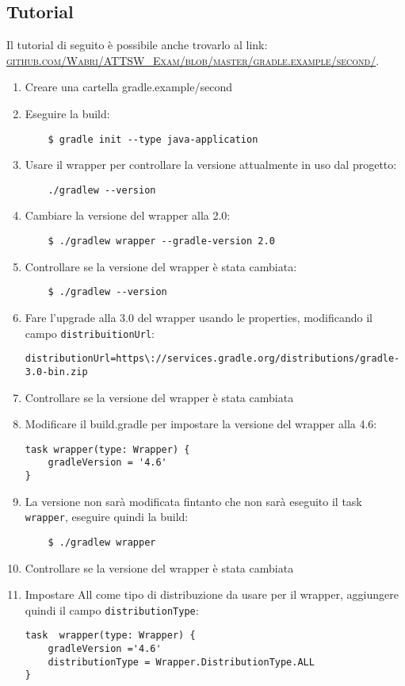 \subsection{Tutorial}
Il tutorial di seguito è possibile anche trovarlo al link: \href{https://github.com/Wabri/ATTSW_Exam/blob/master/gradle.example/second/}{\textsc{github.com/Wabri/ATTSW\_Exam/blob/master/gradle.example/second/}}.
\begin{enumerate}
    \item Creare una cartella gradle.example/second
    \item Eseguire la build:
\begin{verbatim}
    $ gradle init --type java-application
\end{verbatim}
    \item Usare il wrapper per controllare la versione attualmente in uso dal progetto:
\begin{verbatim}
    ./gradlew --version\end{verbatim}
    \item Cambiare la versione del wrapper alla 2.0:
\begin{verbatim}
    $ ./gradlew wrapper --gradle-version 2.0\end{verbatim}
    \item Controllare se la versione del wrapper è stata cambiata:
\begin{verbatim}
    $ ./gradlew --version\end{verbatim}
    \item Fare l'upgrade alla 3.0 del wrapper usando le properties, modificando il campo \texttt{distribuitionUrl}:
\begin{verbatim}
distributionUrl=https\://services.gradle.org/distributions/gradle-3.0-bin.zip \end{verbatim}
    \item Controllare se la versione del wrapper è stata cambiata
    \item Modificare il build.gradle per impostare la versione del wrapper alla 4.6:
\begin{lstlisting}[frame=single]
task wrapper(type: Wrapper) {
    gradleVersion = '4.6'
}
\end{lstlisting}
    \item La versione non sarà modificata fintanto che non sarà eseguito il task \texttt{wrapper}, eseguire quindi la build:
\begin{verbatim}
    $ ./gradlew wrapper\end{verbatim}
    \item Controllare se la versione del wrapper è stata cambiata
    \item Impostare All come tipo di distribuzione da usare per il wrapper, aggiungere quindi il campo \texttt{distributionType}:
\begin{lstlisting}[frame=single]
task  wrapper(type: Wrapper) {
    gradleVersion ='4.6'
    distributionType = Wrapper.DistributionType.ALL
}
\end{lstlisting}
\end{enumerate}
